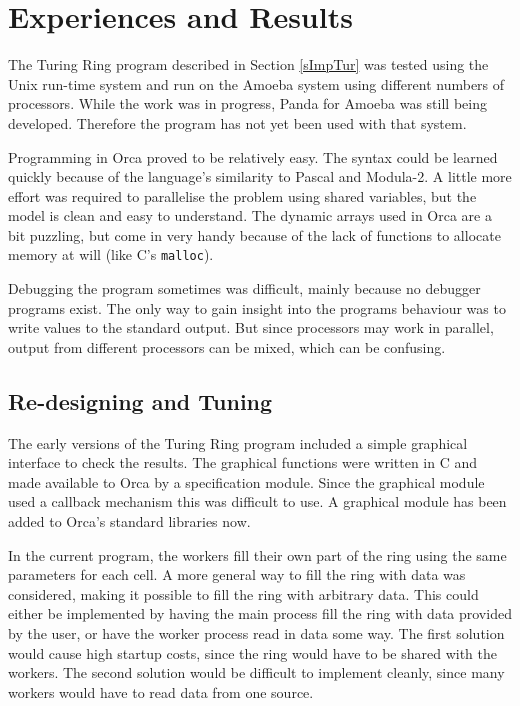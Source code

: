 \section{Experiences and Results}

The Turing Ring program described in Section \ref{sImpTur} was tested
using the Unix run-time system and run on the Amoeba system using
different numbers of processors. While the work was in progress, Panda
for Amoeba was still being developed. Therefore the program has not yet
been used with that system.

Programming in Orca proved to be relatively easy.
The syntax could be learned quickly because of the language's similarity
to Pascal and Modula-2.
A little more effort was required to parallelise the
problem using shared variables, but the model is clean and easy to
understand. The dynamic arrays used in Orca are a bit puzzling, but
come in very handy because of the lack of functions to allocate memory
at will (like C's {\tt malloc}).

Debugging the program sometimes was difficult, mainly because no
debugger programs exist. The only way to gain insight into the programs
behaviour was to write values to the standard output. But since
processors may work in parallel, output from different
processors can be mixed, which can be confusing.

\subsection{Re-designing and Tuning}
The early versions of the Turing Ring program included a simple
graphical interface to check the results. The graphical functions were
written in C and made available to Orca by a specification module.
Since the graphical module used a callback mechanism this was
difficult to use. A graphical module has been added to 
Orca's standard libraries now.

In the current program, the workers fill their own part
of the ring using the same parameters for each cell.
A more general way to fill the ring with data was considered, making
it possible to fill the ring with arbitrary data. This could either be
implemented by having the main process fill the ring with data
provided by the user, or have the worker process read in data some
way. The first solution would cause high startup costs, since the ring
would have to be shared with the workers. The second solution would be
difficult to implement cleanly, since many workers would have to read
data from one source.

